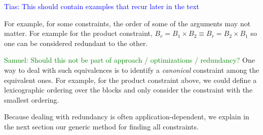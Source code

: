 \documentclass{IEEEtran}
\newcommand{\samuel}[1]{\textcolor{green}{{\sc Samuel:} #1}\xspace}
\newcommand{\tias}[1]{\textcolor{blue}{{\sc Tias:} #1}\xspace}
\newcommand{\eccalc}[2]{\ensuremath{#1 = #2}}
\newcommand{\ecprod}[3]{\eccalc{#1}{#2 \times #3}}
\newcommand{\sg}{B}
\theoremstyle{definition}
\begin{document}
\tias{This should contain examples that recur later in the text}

For example, for some constraints, the order of some of the arguments may not matter. For example for the product constraint, $\ecprod{\sg_r}{\sg_1}{\sg_2} \equiv \ecprod{\sg_r}{\sg_2}{\sg_1}$ so one can be considered redundant to the other.

\samuel{Should this not be part of approach / optimizations / redundancy?}One way to deal with such equivalences is to identify a \textit{canonical} constraint among the equivalent ones. For example, for the product constraint above, we could define a lexicographic ordering over the blocks and only consider the constraint with the smallest ordering.

Because dealing with redundancy is often application-dependent, we explain in the next section our generic method for finding all constraints.
\end{document}
